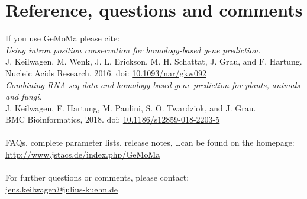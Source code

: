 \documentclass{article}
\begin{document}
\section{Reference, questions and comments}
If you use GeMoMa please cite:\\[\medskipamount]
\emph{Using intron position conservation for homology-based gene prediction.}\\
J. Keilwagen, M. Wenk, J. L. Erickson, M. H. Schattat, J. Grau, and F. Hartung.\\
Nucleic Acids Research, 2016. doi: \href{https://doi.org/10.1093/nar/gkw092}{10.1093/nar/gkw092}\\[\medskipamount]
\emph{Combining RNA-seq data and homology-based gene prediction for plants, animals and fungi.}\\
J. Keilwagen, F. Hartung, M. Paulini, S. O. Twardziok, and J. Grau.\\
BMC Bioinformatics, 2018. doi: \href{https://doi.org/10.1186/s12859-018-2203-5}{10.1186/s12859-018-2203-5}\\
~\\
FAQs, complete parameter lists, release notes, \ldots can be found on the homepage: 
\url{http://www.jstacs.de/index.php/GeMoMa}\\
~\\
For further questions or comments, please contact:\\
\href{mailto:jens.keilwagen@julius-kuehn.de?subject=GeMoMa manual}{jens.keilwagen@julius-kuehn.de}
\end{document}
